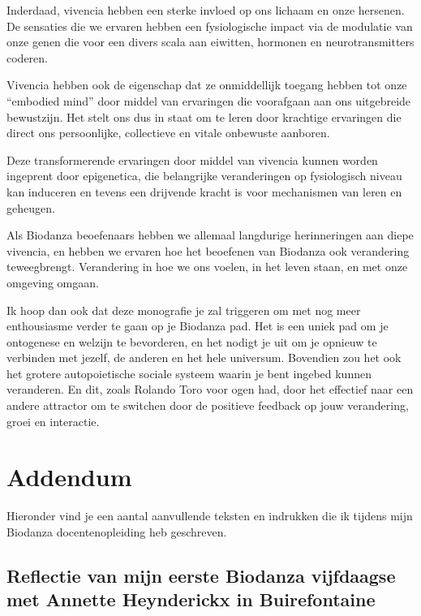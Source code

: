 \documentclass[
  11pt,
]{book}
\begin{document}
Inderdaad, vivencia hebben een sterke invloed op ons lichaam en onze hersenen. De sensaties die we ervaren hebben een fysiologische impact via de modulatie van onze genen die voor een divers scala aan eiwitten, hormonen en neurotransmitters coderen.

Vivencia hebben ook de eigenschap dat ze onmiddellijk toegang hebben tot onze ``embodied mind'' door middel van ervaringen die voorafgaan aan ons uitgebreide bewustzijn. Het stelt ons dus in staat om te leren door krachtige ervaringen die direct ons persoonlijke, collectieve en vitale onbewuste aanboren.

Deze transformerende ervaringen door middel van vivencia kunnen worden ingeprent door epigenetica, die belangrijke veranderingen op fysiologisch niveau kan induceren en tevens een drijvende kracht is voor mechanismen van leren en geheugen.

Als Biodanza beoefenaars hebben we allemaal langdurige herinneringen aan diepe vivencia, en hebben we ervaren hoe het beoefenen van Biodanza ook verandering teweegbrengt. Verandering in hoe we ons voelen, in het leven staan, en met onze omgeving omgaan.

Ik hoop dan ook dat deze monografie je zal triggeren om met nog meer enthousiasme verder te gaan op je Biodanza pad. Het is een uniek pad om je ontogenese en welzijn te bevorderen, en het nodigt je uit om je opnieuw te verbinden met jezelf, de anderen en het hele universum. Bovendien zou het ook het grotere autopoietische sociale systeem waarin je bent ingebed kunnen veranderen. En dit, zoals Rolando Toro voor ogen had, door het effectief naar een andere attractor om te switchen door de positieve feedback op jouw verandering, groei en interactie.

\hypertarget{addendum}{%
\chapter*{Addendum}\label{addendum}}

Hieronder vind je een aantal aanvullende teksten en indrukken die ik tijdens mijn Biodanza docentenopleiding heb geschreven.

\hypertarget{reflectie-van-mijn-eerste-biodanza-vijfdaagse-met-annette-heynderickx-in-buirefontaine}{%
\section*{Reflectie van mijn eerste Biodanza vijfdaagse met Annette Heynderickx in Buirefontaine}\label{reflectie-van-mijn-eerste-biodanza-vijfdaagse-met-annette-heynderickx-in-buirefontaine}}
\end{document}
